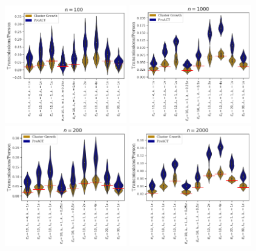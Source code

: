 \documentclass[a4paper,11pt]{article}
\begin{document}
\begin{figure}[!h]
\centering
\includegraphics[width=0.475\textwidth]{figs/results_efficacy_individual_n100.pdf}
\includegraphics[width=0.475\textwidth]{figs/results_efficacy_individual_n1000.pdf}\\
\includegraphics[width=0.475\textwidth]{figs/results_efficacy_individual_n200.pdf}
\includegraphics[width=0.475\textwidth]{figs/results_efficacy_individual_n2000.pdf}\\

\end{figure}
\end{document}
